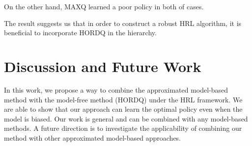 \documentclass{article} %
\begin{document}
On the other hand, MAXQ learned a poor policy in both of cases.  

The result suggests us that in order to construct a robust HRL 
algorithm, it is beneficial to incorporate HORDQ in the hierarchy.



\section{Discussion and Future Work}
In this work, we propose a way to combine the approximated model-based method with the model-free
method (HORDQ) under the HRL framework. We are able to show that our approach can learn the optimal
policy even when the model is biased.  
Our work is general and can be combined with any model-based methods. 
A future direction is to investigate the applicability of combining our method with
other approximated model-based approaches.



{\small


}
\end{document}
